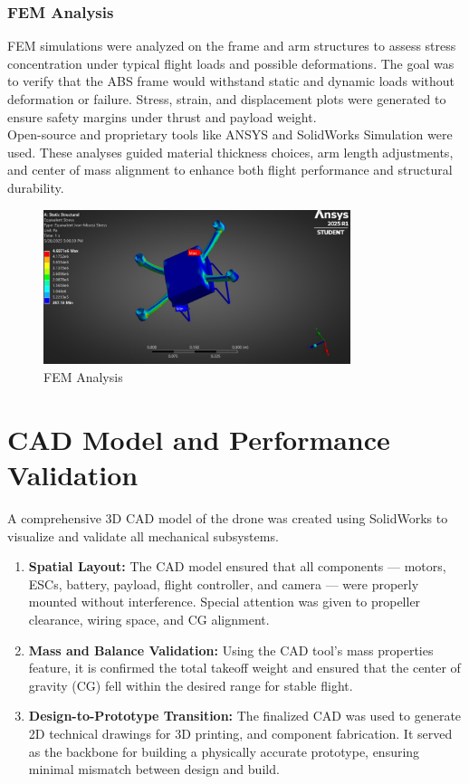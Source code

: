 \documentclass[12pt]{report}
\begin{document}
    \subsubsection{\large FEM Analysis}
    FEM simulations were analyzed on the frame and arm structures to assess stress concentration under typical flight loads and possible deformations. The goal was to verify that the ABS frame would withstand static and dynamic loads without deformation or failure. Stress, strain, and displacement plots were generated to ensure safety margins under thrust and payload weight.\\

Open-source and proprietary tools like ANSYS and SolidWorks Simulation were used. These analyses guided material thickness choices, arm length adjustments, and center of mass alignment to enhance both flight performance and structural durability.

      \begin{figure}[H]
        \begin{center}
          \includegraphics[width=0.8\textwidth]{fem.jpeg}
        \end{center}
        \caption{FEM Analysis}\label{fig:femanalysis}
      \end{figure}
      

    \section{CAD Model and Performance Validation}
    A comprehensive 3D CAD model of the drone was created using SolidWorks to visualize and validate all mechanical subsystems.
    \begin{enumerate}
      \item \textbf{Spatial Layout:} The CAD model ensured that all components — motors, ESCs, battery, payload, flight controller, and camera — were properly mounted without interference. Special attention was given to propeller clearance, wiring space, and CG alignment.
      \item \textbf{Mass and Balance Validation:} Using the CAD tool’s mass properties feature, it is confirmed the total takeoff weight and ensured that the center of gravity (CG) fell within the desired range for stable flight. 
      \item \textbf{Design-to-Prototype Transition:} The finalized CAD was used to generate 2D technical drawings for 3D printing, and component fabrication. It served as the backbone for building a physically accurate prototype, ensuring minimal mismatch between design and build.
    \end{enumerate}
\end{document}
